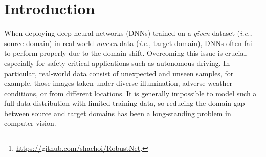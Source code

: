 \documentclass[final]{latex/cvpr}
\begin{document}
\vspace{-0.4cm}
\begin{abstract}
\vspace{-0.2cm}
   Enhancing the generalization capability of deep neural networks to unseen domains is crucial for safety-critical applications in the real world such as autonomous driving.
   To address this issue, this paper proposes a novel instance selective whitening loss to improve the robustness of the segmentation networks for unseen domains. 
   Our approach disentangles the domain-specific style and domain-invariant content encoded in higher-order statistics (\textit{i.e.,} feature covariance) of the feature representations and selectively removes only the style information causing domain shift. As shown in Fig.~\ref{fig:supp_main}, our method provides reasonable predictions for (a) low-illuminated, (b) rainy, and (c) unseen structures. These types of images are not included in the training dataset, where the baseline shows a significant performance drop, contrary to ours.
   Being simple yet effective, our approach improves the robustness of various backbone networks without additional computational cost. 
   We conduct extensive experiments in urban-scene segmentation and show the superiority of our approach to existing work. Our code is available at this link\footnote{\vspace{-0.25cm} \url{https://github.com/shachoi/RobustNet}.}.
\vspace{-0.4cm}
\end{abstract}


\vspace{-0.1cm}
\section{Introduction}\label{introduction}
\vspace{-0.05cm}
When deploying deep neural networks (DNNs) trained on a \emph{given} dataset (\textit{i.e.,} source domain) in real-world \emph{unseen} data (\textit{i.e.,} target domain), DNNs often fail to perform properly due to the domain shift. Overcoming this issue is crucial, especially for safety-critical applications such as autonomous driving. In particular, real-world data consist of unexpected and unseen samples, for example, those images taken under diverse illumination, adverse weather conditions, or from different locations. It is generally impossible to model such a full data distribution with limited training data, so reducing the domain gap between source and target domains has been a long-standing problem in computer vision.
\end{document}
